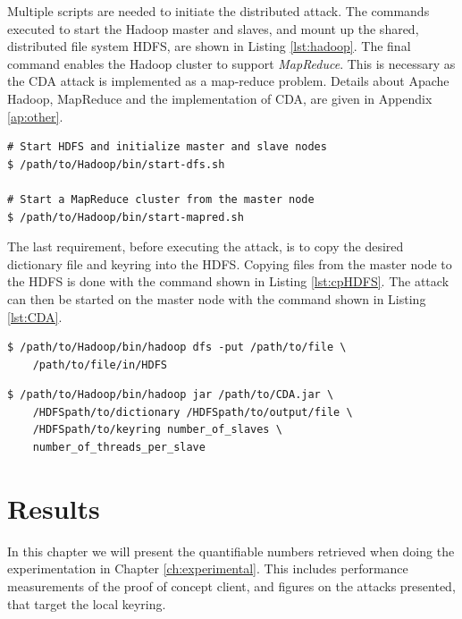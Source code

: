 \documentclass[pdftex,english,10pt,b5paper,twoside]{book}
\begin{document}
Multiple scripts are needed to initiate the distributed attack.
The commands executed to start the Hadoop master and slaves, and mount up the
shared, distributed file system \ac{HDFS}, are shown in Listing
\ref{lst:hadoop}. The final command enables the Hadoop cluster to support
\emph{MapReduce}. This is necessary as the \ac{CDA} attack is implemented as a
map-reduce problem. Details about Apache Hadoop, MapReduce and the
implementation of \ac{CDA}, are given in Appendix \ref{ap:other}.

\lstset{language=bash, label=lst:hadoop, caption=Starting Hadoop Cluster with HDFS}
\begin{lstlisting}
# Start HDFS and initialize master and slave nodes
$ /path/to/Hadoop/bin/start-dfs.sh

# Start a MapReduce cluster from the master node
$ /path/to/Hadoop/bin/start-mapred.sh
\end{lstlisting}

The last requirement, before executing the attack, is to copy the
desired dictionary file and keyring into the \ac{HDFS}. Copying files from the
master node to the \ac{HDFS} is done with the command shown in Listing
\ref{lst:cpHDFS}. The attack can then be started on the master node with the
command shown in Listing \ref{lst:CDA}.

\lstset{language=bash, label=lst:cpHDFS, caption=Copying files into HDFS}
\begin{lstlisting}
$ /path/to/Hadoop/bin/hadoop dfs -put /path/to/file \
    /path/to/file/in/HDFS
\end{lstlisting}

\lstset{language=bash, label=lst:CDA, caption=Executing the CDA Attack}
\begin{lstlisting}
$ /path/to/Hadoop/bin/hadoop jar /path/to/CDA.jar \
    /HDFSpath/to/dictionary /HDFSpath/to/output/file \
    /HDFSpath/to/keyring number_of_slaves \
    number_of_threads_per_slave
\end{lstlisting}

\chapter{Results}
\label{ch:results}

In this chapter we will present the quantifiable numbers retrieved when doing
the experimentation in Chapter \ref{ch:experimental}. This includes performance
measurements of the proof of concept client, and figures on the attacks
presented, that target the local keyring.
\end{document}
